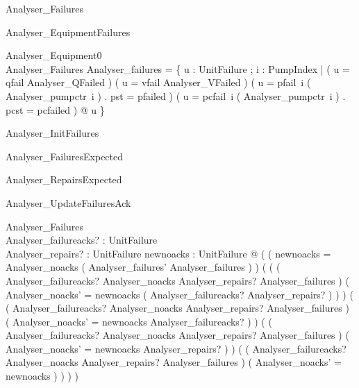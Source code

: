 \documentclass{article}
\begin{document}
\begin{zed}
	Analyser\_Failures 
\end{zed}

\begin{schema}{Analyser\_EquipmentFailures}

 Analyser\_Equipment0 \\
 Analyser\_Failures 
\where
 Analyser\_failures = \{ u : UnitFailure ; i : PumpIndex | ( u = qfail \land Analyser\_QFailed ) \lor ( u = vfail \land Analyser\_VFailed ) \lor ( u = pfail~i \land ( Analyser\_pumpctr~i ) . pst = pfailed ) \lor ( u = pcfail~i \land ( Analyser\_pumpctr~i ) . pcst = pcfailed ) @ u \}
\end{schema}

\begin{zed}
	Analyser\_InitFailures 
\end{zed}

\begin{zed}
	Analyser\_FailuresExpected 
\end{zed}

\begin{zed}
	Analyser\_RepairsExpected 
\end{zed}

\begin{schema}{Analyser\_UpdateFailuresAck}

 \Delta Analyser\_Failures \\
 Analyser\_failureacks? : \power UnitFailure \\
 Analyser\_repairs? : \power UnitFailure 
\where
 \exists newnoacks : \power UnitFailure @ ( ( newnoacks = Analyser\_noacks \cup ( Analyser\_failures' \setminus Analyser\_failures ) ) \land ( ( ( Analyser\_failureacks? \subseteq Analyser\_noacks \land Analyser\_repairs? \subseteq Analyser\_failures ) \implies ( Analyser\_noacks' = newnoacks \setminus ( Analyser\_failureacks? \cup Analyser\_repairs? ) ) ) \land ( ( Analyser\_failureacks? \subseteq Analyser\_noacks \land \lnot Analyser\_repairs? \subseteq Analyser\_failures ) \implies ( Analyser\_noacks' = newnoacks \setminus Analyser\_failureacks? ) ) \land ( ( \lnot Analyser\_failureacks? \subseteq Analyser\_noacks \land Analyser\_repairs? \subseteq Analyser\_failures ) \implies ( Analyser\_noacks' = newnoacks \setminus Analyser\_repairs? ) ) \land ( ( \lnot Analyser\_failureacks? \subseteq Analyser\_noacks \land \lnot Analyser\_repairs? \subseteq Analyser\_failures ) \implies ( Analyser\_noacks' = newnoacks ) ) ) )
\end{schema}
\end{document}
